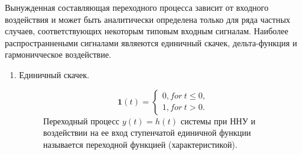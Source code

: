 Вынужденная составляющая переходного процесса зависит от входного воздействия и может быть аналитически определена только для ряда частных случаев, соответствующих некоторым типовым входным сигналам. Наиболее распространнеными сигналами являеются единичный скачек, дельта-функция и гармоничческое воздействие.
\begin{enumerate}
    \item Единичный скачек.
    \begin{figure}[!h]
        \begin{minipage}[!h]{0.5\linewidth}
        \end{minipage}
        \begin{minipage}[!h]{0.5\linewidth}
            \begin{equation}
                \mathbf{1}(t) = 
                \begin{cases}
                    0, for \: t \le 0, \\
                    1, for \: t > 0.
                \end{cases}
            \end{equation}
            Переходный процесс $y(t) = h(t)$ системы при ННУ и воздействии на ее вход ступенчатой единичной функции называется переходной функцией (характеристикой).
        \end{minipage}
    \end{figure}
    

\end{enumerate}
